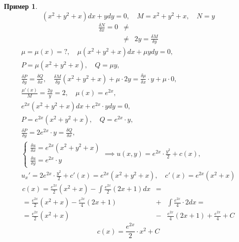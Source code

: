 \documentclass{report}
\theoremstyle{definition}
\newtheorem{example}{Пример}
\begin{document}
\begin{example}
    \begin{equation*}
        (x^2 + y^2 + x)dx + ydy = 0, \quad M = x^2 + y^2 + x, \quad N = y
    \end{equation*}
    \begin{eqnarray*}
        \frac{\delta N}{\delta x} = 0 & \ne & \\
        & \ne & 2y = \frac{\delta M}{\delta y}
    \end{eqnarray*}
    \begin{multline*}
        \mu = \mu(x) = ?, \quad \mu(x^2 + y^2 + x)dx + \mu y dy = 0, \\
        P = \mu(x^2 + y^2 + x), \quad Q = \mu y, \\
        \frac{\delta P}{\delta y} = \frac{\delta Q}{\delta x}, \quad \frac{\delta M}{\delta y}(x^2 + y^2 + x) + \mu \cdot 2y = \frac{\delta \mu}{\delta x} \cdot y + \mu \cdot 0, \\
        \frac{\mu'(x)}{M} = \frac{2y}{y} = 2, \quad \mu(x) = e^{2x}, \\
        e^{2x}(x^2 + y^2 + x) dx + e^{2x} \cdot y dy = 0, \\
        P = e^{2x}(x^2 + y^2 + x), \quad Q = e^{2x}\cdot y, \\
        \frac{\delta P}{\delta y} = 2e^{2x} \cdot y = \frac{\delta Q}{\delta x}, \\
        \left\{\begin{array}{l}
            \frac{\delta u}{\delta x} = e^{2x}(x^2 + y^2 + x) \\
            \frac{\delta u}{\delta y} = e^{2x}\cdot y
        \end{array}\right. \implies u(x,y) = e^{2x} \cdot \frac{y^2}{2} + c(x), \\
        u_x' = 2e^{2x} \cdot \frac{y^2}{2} + c'(x) = e^{2x}(x^2 + y^2 + x), \quad c'(x) = e^{2x}(x^2 + x)
    \end{multline*}
    \begin{eqnarray*}
        c(x) = \frac{e^{2x}}{2}(x^2 + x) - \int \frac{e^{2x}}{2}(2x + 1)dx & = & \\
        = \frac{e^{2x}}{2}(x^2 + x) - \frac{e^{2x}}{4}(2x + 1) &+& \int \frac{e^{2x}}{4}\cdot 2 dx = \\
        = \frac{e^{2x}}{2}(x^2 + x) &-& \frac{e^{2x}}{4}(2x+1) + \frac{e^{2x}}{4} + C
    \end{eqnarray*}
    \begin{equation*}
        c(x) = \frac{e^{2x}}{2}\cdot x^2 + C
    \end{equation*}

\end{example}
\end{document}
